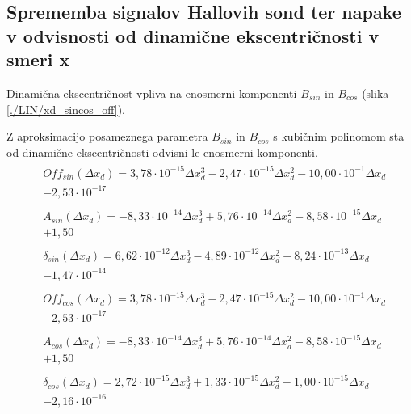 \subsection{Sprememba signalov Hallovih sond ter napake v odvisnosti od dinamične ekscentričnosti v smeri x}
Dinamična ekscentričnost vpliva na enosmerni komponenti $B_{sin}$ in $B_{cos}$ (slika \ref{./LIN/xd_sincos_off}).

Z aproksimacijo posameznega parametra $B_{sin}$ in $B_{cos}$ s kubičnim polinomom sta od dinamične ekscentričnosti odvisni le enosmerni komponenti.
\begin{eqnarray}
\label{analog_lin_xd}
&\begin{split}Off_{sin}(\Delta x_d) =3,78\cdot 10^{-15}\Delta x_d^{3}-2,47\cdot 10^{-15}\Delta x_d^{2}-10,00\cdot 10^{-1}\Delta x_d\\-2,53\cdot 10^{-17} \end{split}\\   
&\begin{split}A_{sin}(\Delta x_d) =-8,33\cdot 10^{-14}\Delta x_d^{3}+5,76\cdot 10^{-14}\Delta x_d^{2}-8,58\cdot 10^{-15}\Delta x_d\\+1,50\end{split} \\                  
&\begin{split}\delta_{sin}(\Delta x_d) =6,62\cdot 10^{-12}\Delta x_d^{3}-4,89\cdot 10^{-12}\Delta x_d^{2}+8,24\cdot 10^{-13}\Delta x_d \\ -1,47\cdot 10^{-14}\end{split}\\      
&\begin{split}Off_{cos}(\Delta x_d) =3,78\cdot 10^{-15}\Delta x_d^{3}-2,47\cdot 10^{-15}\Delta x_d^{2}-10,00\cdot 10^{-1}\Delta x_d\\-2,53\cdot 10^{-17} \end{split}\\   
&\begin{split}A_{cos}(\Delta x_d) =-8,33\cdot 10^{-14}\Delta x_d^{3}+5,76\cdot 10^{-14}\Delta x_d^{2}-8,58\cdot 10^{-15}\Delta x_d\\+1,50 \end{split}\\                  
&\begin{split}\delta_{cos}(\Delta x_d) =2,72\cdot 10^{-15}\Delta x_d^{3}+1,33\cdot 10^{-15}\Delta x_d^{2}-1,00\cdot 10^{-15}\Delta x_d\\-2,16\cdot 10^{-16}\end{split}
\end{eqnarray}
